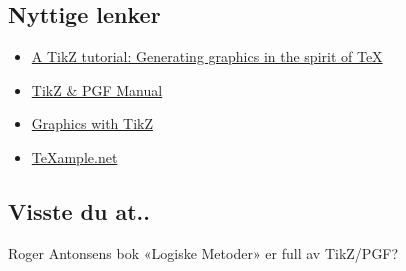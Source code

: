 \documentclass[11pt, a4paper]{article}
\begin{document}
\subsection{Nyttige lenker}
\begin{itemize}
	\item
	\href{http://www.tug.org/TUGboat/tb30-2/tb95mertz.pdf}{A TikZ tutorial: Generating graphics in the spirit of \TeX}
	\item
	\href{http://www.texample.net/media/pgf/builds/pgfmanualCVS2012-11-04.pdf}{TikZ \& PGF Manual}
	\item
	\href{https://www.tug.org/pracjourn/2007-1/mertz/mertz.pdf}{Graphics with TikZ}
	\item
	\href{http://www.texample.net/}{TeXample.net}
\end{itemize}


\subsection*{Visste du at..}
Roger Antonsens bok «Logiske Metoder» er full av TikZ/PGF?
\end{document}
